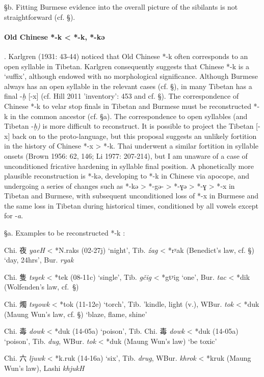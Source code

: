 §b. Fitting Burmese evidence into the overall picture of the sibilants
is not straightforward (cf. §).

\paragraph{Old Chinese *-k \textless{} *-k, *-kə}.
Karlgren (1931: 43-44) noticed that Old Chinese *-k often corresponds to
an open syllable in Tibetan. Karlgren consequently suggests that Chinese
*-k is a `suffix', although endowed with no morphological significance.
Although Burmese always has an open syllable in the relevant cases (cf.
§), in many Tibetan has a final -\emph{ḫ} {[}-x] (cf. Hill 2011
'inventory': 453 and cf. §). The correspondence of Chinese *-k to velar
stop finals in Tibetan and Burmese must be reconstructed *-k in the
common ancestor (cf. §a). The correspondence to open syllables (and
Tibetan -\emph{ḫ)} is more difficult to reconstruct. It is possible to
project the Tibetan {[}-x] back on to the proto-language, but this
proposal suggests an unlikely fortition in the history of Chinese *-x
\textgreater{} *‑k. Thai underwent a similar fortition in syllable
onsets (Brown 1956: 62, 146; Li 1977: 207-214), but I am unaware of a
case of unconditioned fricative hardening in syllable final position. A
phonetically more plausible reconstruction is *-kə, developing to *-k in
Chinese via apocope, and undergoing a series of changes such as *-kə
\textgreater{} *-gə- \textgreater{} *-ɣə \textgreater{} *-ɣ
\textgreater{} *‑x in Tibetan and Burmese, with subsequent unconditioned
loss of *-x in Burmese and the same loss in Tibetan during historical
times, conditioned by all vowels except for -\emph{a}.

§a. Examples to be reconstructed *-k :
\begin{description} \item
Chi. 夜  \emph{yaeH} \textless{} *N.raks (02-27j) `night', Tib. {} \emph{źag} \textless{} *rʸak (Benedict's law, cf. §) `day, 24hrs', Bur. {} \emph{ryak}
\item
Chi. 隻  \emph{tsyek} \textless{} *tek (08-11c) `single', Tib. {} \emph{gčig} \textless{} *gtʸig `one', Bur. {} \emph{tac} \textless{}
*dik (Wolfenden's law, cf.~§)
\item
Chi. 燭  \emph{tsyowk }\textless{} *tok (11-12e) `torch', Tib. {}
'kindle, light (v.), WBur. {} \emph{tok} \textless{} *duk (Maung
Wun's law, cf. §) `blaze, flame, shine'
\item
Chi. 毒  \emph{dowk} \textless{} *d{}uk (14-05a) `poison', Tib.
\protect\hypertarget{anchor-52}{}{}Chi. 毒 \emph{dowk} \textless{} *d{}uk
(14-05a) `poison', Tib. {} \emph{dug}, WBur. {} \emph{tok}
\textless{} *duk (Maung Wun's law) `be toxic'
\item
Chi. 六  \emph{ljuwk} \textless{} *k.ruk (14-16a) `six', Tib. {} \emph{drug}, WBur. {} \emph{khrok} \textless{} *kruk (Maung Wun's
law), Lashi  \emph{khjukH}
\end{description}

